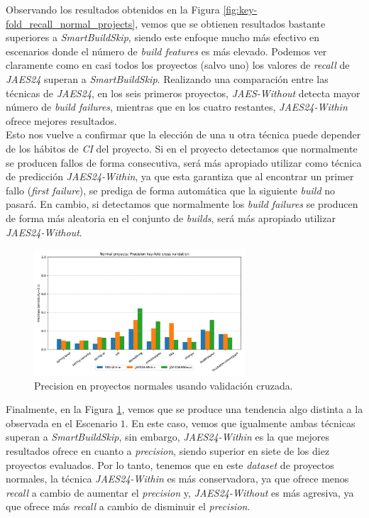 Observando los resultados obtenidos en la Figura \ref{fig:key-fold_recall_normal_projects}, vemos
que se obtienen resultados bastante superiores a \textit{SmartBuildSkip}, siendo este enfoque
mucho más efectivo en escenarios donde el número de \textit{build features} es más elevado. Podemos
ver claramente como en casi todos los proyectos (salvo uno) los valores de \textit{recall} de
\textit{JAES24} superan a \textit{SmartBuildSkip}. Realizando una comparación entre las técnicas
de \textit{JAES24}, en los seis primeros proyectos, \textit{JAES-Without} detecta mayor número
de \textit{build failures}, mientras que en los cuatro restantes, \textit{JAES24-Within} ofrece
mejores resultados.\\

Esto nos vuelve a confirmar que la elección de una u otra técnica puede depender de los hábitos
de \textit{CI} del proyecto. Si en el proyecto detectamos que normalmente se producen fallos
de forma consecutiva, será más apropiado utilizar como técnica de predicción
\textit{JAES24-Within}, ya que esta garantiza que al encontrar un primer fallo (\textit{first
failure}), se prediga de forma automática que la siguiente \textit{build} no pasará. En cambio,
si detectamos que normalmente los \textit{build failures} se producen de forma más aleatoria en
el conjunto de \textit{builds}, será más apropiado utilizar \textit{JAES24-Without}.

\begin{figure}[H]
    \centering
    \includegraphics[width=0.7\textwidth]{images/Normal projects: Precision key-fold cross validation.pdf}
    \caption{Precision en proyectos normales usando validación cruzada.}
    \label{fig:key-fold_precision_normal_projects}
\end{figure}

Finalmente, en la Figura \ref{fig:key-fold_precision_normal_projects}, vemos que se produce una
tendencia algo distinta a la observada en el Escenario $1$. En este caso, vemos que igualmente
ambas técnicas superan a \textit{SmartBuildSkip}, sin embargo, \textit{JAES24-Within} es la que
mejores resultados ofrece en cuanto a \textit{precision}, siendo superior en siete de los diez
proyectos evaluados. Por lo tanto, tenemos que en este \textit{dataset} de proyectos normales, la
técnica \textit{JAES24-Within} es más conservadora, ya que ofrece menos \textit{recall} a cambio
de aumentar el \textit{precision} y, \textit{JAES24-Without} es más agresiva, ya que ofrece más
\textit{recall} a cambio de disminuir el \textit{precision}.\\

